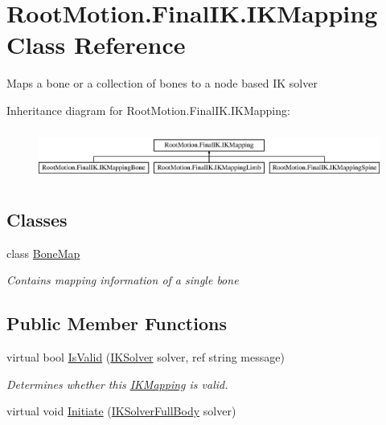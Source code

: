 \hypertarget{class_root_motion_1_1_final_i_k_1_1_i_k_mapping}{}\section{Root\+Motion.\+Final\+I\+K.\+I\+K\+Mapping Class Reference}
\label{class_root_motion_1_1_final_i_k_1_1_i_k_mapping}


Maps a bone or a collection of bones to a node based IK solver  


Inheritance diagram for Root\+Motion.\+Final\+I\+K.\+I\+K\+Mapping\+:\begin{figure}[H]
\begin{center}
\leavevmode
\includegraphics[height=1.681682cm]{class_root_motion_1_1_final_i_k_1_1_i_k_mapping}
\end{center}
\end{figure}
\subsection*{Classes}
\begin{DoxyCompactItemize}
\item 
class \mbox{\hyperlink{class_root_motion_1_1_final_i_k_1_1_i_k_mapping_1_1_bone_map}{Bone\+Map}}
\begin{DoxyCompactList}\small\item\em Contains mapping information of a single bone \end{DoxyCompactList}\end{DoxyCompactItemize}
\subsection*{Public Member Functions}
\begin{DoxyCompactItemize}
\item 
virtual bool \mbox{\hyperlink{class_root_motion_1_1_final_i_k_1_1_i_k_mapping_a4a81f9083afd318e2578de48fa914870}{Is\+Valid}} (\mbox{\hyperlink{class_root_motion_1_1_final_i_k_1_1_i_k_solver}{I\+K\+Solver}} solver, ref string message)
\begin{DoxyCompactList}\small\item\em Determines whether this \mbox{\hyperlink{class_root_motion_1_1_final_i_k_1_1_i_k_mapping}{I\+K\+Mapping}} is valid. \end{DoxyCompactList}\item 
virtual void \mbox{\hyperlink{class_root_motion_1_1_final_i_k_1_1_i_k_mapping_a530ab0e13f90bde214eba3a23ed24d73}{Initiate}} (\mbox{\hyperlink{class_root_motion_1_1_final_i_k_1_1_i_k_solver_full_body}{I\+K\+Solver\+Full\+Body}} solver)
\end{DoxyCompactItemize}
